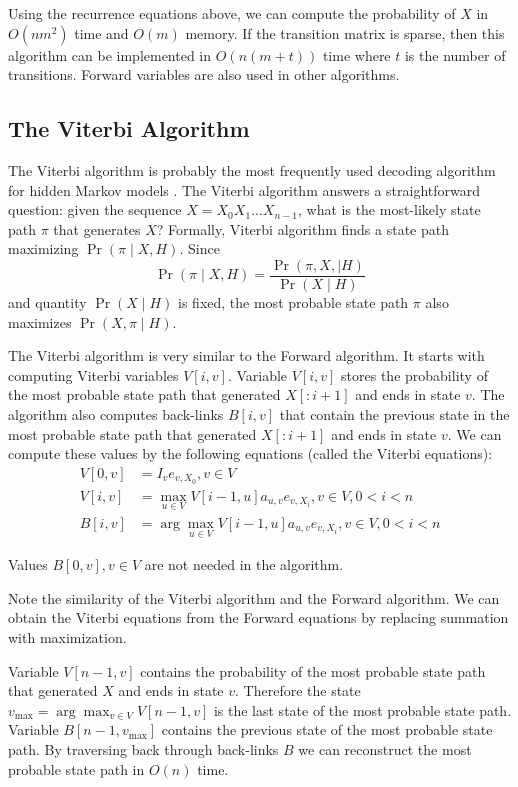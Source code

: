 Using the recurrence equations above, we can compute the probability of $X$ in
$O(nm^2)$ time and $O(m)$ memory. If the transition
matrix is sparse, then this algorithm can be implemented in $O(n(m+t))$ time
where $t$ is the number of transitions.  Forward variables are also used in other
algorithms. 

\subsection{The Viterbi Algorithm}\label{SECTION:VITERBI}
The Viterbi algorithm  is probably the most frequently used
decoding algorithm for hidden Markov
models \cite{Durbin1998}.
The Viterbi algorithm answers a straightforward question: given the sequence
$X=X_0X_1\dots X_{n-1}$, what
is the most-likely state path $\pi$ that generates $X$? Formally, Viterbi
algorithm finds a state path maximizing $\Pr\left( \pi\mid X,H \right)$. Since
\[\Pr\left(\pi\mid X,H\right) = \frac{\Pr\left(\pi,X,\mid
H\right)}{\Pr\left(X\mid H\right)}\] and quantity $\Pr\left(X\mid H\right)$ is
fixed, the most probable state path $\pi$ also maximizes $\Pr\left(X,\pi\mid H\right)$. 

The Viterbi algorithm is very similar to the  Forward algorithm. It starts with computing
Viterbi variables $V[i,v]$. Variable $V[i,v]$ stores the probability of the most probable 
state path that generated $X[:i+1]$ and ends in state $v$. The algorithm
also computes back-links $B[i,v]$ that contain the previous state in the most
probable state path that generated $X[:i+1]$ and ends in state $v$. We can
compute these values by the following equations (called the Viterbi equations):
\begin{align}
V[0,v] &= I_{v}e_{v,X_0}, v\in V\\
V[i,v] &= \max_{u\in V} V[i-1,u]a_{u,v}e_{v,X_i}, v\in V,0<i<n\\
B[i,v] &= \arg\max_{u\in V} V[i-1,u]a_{u,v}e_{v,X_i}, v\in V,0<i<n
\end{align}
\begin{note}
Values $B[0,v],v\in V$ are not needed in the algorithm.

Note the similarity of the Viterbi algorithm and the Forward algorithm.
We can obtain the Viterbi equations from the Forward equations by replacing
summation with
maximization.
\end{note}


Variable $V[n-1,v]$ contains the probability of the most probable state path
that generated $X$ and ends in state $v$. Therefore the state $v_{\max} =
\arg\max_{v\in V}V[n-1,v]$ is the last state of the most probable state path.
Variable $B[n-1,v_{\max}]$ contains the previous state of the most probable
state path. By traversing back through back-links $B$ we can reconstruct the most
probable state path in $O(n)$ time.


